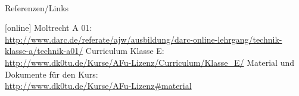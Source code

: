 \renewcommand{\refname}{Referenzen}

\hypertarget{refs}{}
\textcolor{white}{} \\ %
\Large Referenzen/Links
\footnotesize

\begin{thebibliography}{}
    [online]
   Moltrecht A 01: \\
    \url{http://www.darc.de/referate/ajw/ausbildung/darc-online-lehrgang/technik-klasse-a/technik-a01/}
    Curriculum Klasse E: \\
    \url{http://www.dk0tu.de/Kurse/AFu-Lizenz/Curriculum/Klasse_E/}
     Material und Dokumente für den Kurs: \\
    \url{http://www.dk0tu.de/Kurse/AFu-Lizenz#material}
\end{thebibliography}


